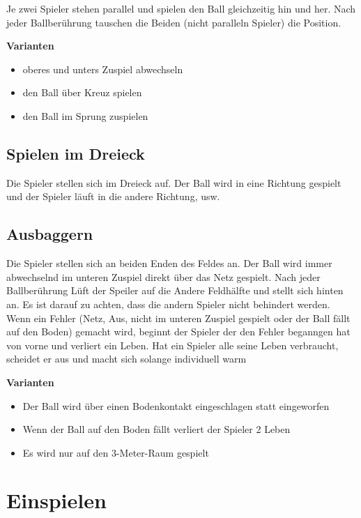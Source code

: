 \documentclass[]{book}
\providecommand{\tightlist}{%
  \setlength{\itemsep}{0pt}\setlength{\parskip}{0pt}}
\begin{document}
Je zwei Spieler stehen parallel und spielen den Ball gleichzeitig hin
und her. Nach jeder Ballberührung tauschen die Beiden (nicht paralleln
Spieler) die Position.

\textbf{Varianten}

\begin{itemize}
\tightlist
\item
  oberes und unters Zuspiel abwechseln
\item
  den Ball über Kreuz spielen
\item
  den Ball im Sprung zuspielen
\end{itemize}

\section{Spielen im Dreieck}\label{spielen-im-dreieck}

Die Spieler stellen sich im Dreieck auf. Der Ball wird in eine Richtung
gespielt und der Spieler läuft in die andere Richtung, usw.

\section{Ausbaggern}\label{ausbaggern}

Die Spieler stellen sich an beiden Enden des Feldes an. Der Ball wird
immer abwechselnd im unteren Zuspiel direkt über das Netz gespielt. Nach
jeder Ballberührung Lüft der Speiler auf die Andere Feldhälfte und
stellt sich hinten an. Es ist darauf zu achten, dass die andern Spieler
nicht behindert werden. Wenn ein Fehler (Netz, Aus, nicht im unteren
Zuspiel gespielt oder der Ball fällt auf den Boden) gemacht wird,
beginnt der Spieler der den Fehler beganngen hat von vorne und verliert
ein Leben. Hat ein Spieler alle seine Leben verbraucht, scheidet er aus
und macht sich solange individuell warm

\textbf{Varianten}

\begin{itemize}
\tightlist
\item
  Der Ball wird über einen Bodenkontakt eingeschlagen statt eingeworfen
\item
  Wenn der Ball auf den Boden fällt verliert der Spieler 2 Leben
\item
  Es wird nur auf den 3-Meter-Raum gespielt
\end{itemize}

\chapter{Einspielen}\label{einspielen}
\end{document}
